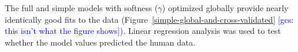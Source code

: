 \documentclass[11pt,a4paper]{article}
\newcommand{\gcs}[1]{\textcolor{blue}{[gcs: #1]}}
\begin{document}
The full and simple models with softness ($\gamma$) optimized globally provide nearly identically good fits to the data  (Figure~\ref{simple-global-and-cross-validated} \gcs{this isn't what the figure shows}). Linear regression analysis was used to test whether the model values predicted the human data. 
\end{document}

